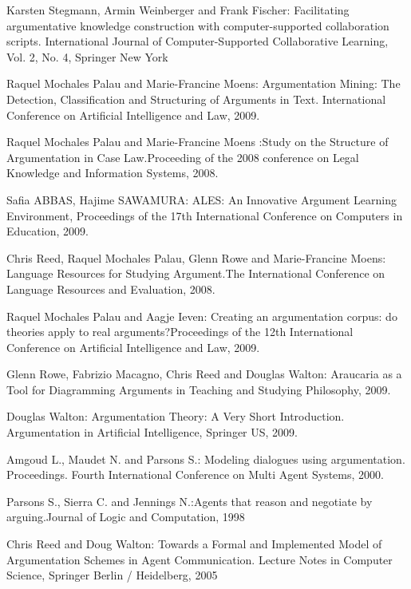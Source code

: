 \documentclass[lnbip]{svmultln}
\begin{document}
\newpage
\begin{thebibliography}{5}

Karsten Stegmann, Armin Weinberger and Frank Fischer: Facilitating argumentative knowledge construction with computer-supported collaboration scripts. International Journal of Computer-Supported Collaborative Learning, Vol. 2, No. 4, Springer New York

Raquel Mochales Palau and Marie-Francine Moens: Argumentation Mining: The Detection, Classification and Structuring of Arguments in Text.  	 International Conference on Artificial Intelligence and Law, 2009.

Raquel Mochales Palau and Marie-Francine Moens :Study on the Structure of Argumentation in Case Law.Proceeding of the 2008 conference on Legal Knowledge and Information Systems, 2008.

Safia ABBAS, Hajime SAWAMURA: ALES: An Innovative Argument Learning Environment, Proceedings of the 17th International Conference on Computers in Education, 2009.

Chris Reed, Raquel Mochales Palau, Glenn Rowe and Marie-Francine Moens: Language Resources for Studying Argument.The International Conference on Language Resources and Evaluation, 2008.

Raquel Mochales Palau and Aagje Ieven: Creating an argumentation corpus: do theories apply to real arguments?Proceedings of the 12th International Conference on Artificial Intelligence and Law, 2009.

Glenn Rowe, Fabrizio Macagno, Chris Reed and Douglas Walton: Araucaria as a Tool for Diagramming Arguments in Teaching and Studying Philosophy, 2009.

Douglas Walton: Argumentation Theory: A Very Short Introduction. 	Argumentation in Artificial Intelligence, Springer US, 2009.

Amgoud L., Maudet N. and Parsons S.: Modeling dialogues using argumentation. Proceedings. Fourth International Conference on Multi Agent Systems, 2000.

Parsons S., Sierra C. and Jennings N.:Agents that reason and negotiate by arguing.Journal of Logic and Computation, 1998

Chris Reed and Doug Walton: Towards a Formal and Implemented Model of Argumentation Schemes in Agent Communication. Lecture Notes in Computer Science, Springer Berlin / Heidelberg, 2005


\end{thebibliography}
\end{document}
